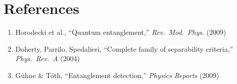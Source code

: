 \documentclass[11pt,a4paper]{article}
\begin{document}
\section*{References}

\begin{enumerate}
    \item Horodecki et al., ``Quantum entanglement,'' \textit{Rev.\ Mod.\ Phys.} (2009)
    \item Doherty, Parrilo, Spedalieri, ``Complete family of separability criteria,'' \textit{Phys.\ Rev.\ A} (2004)
    \item G\"uhne \& T\'oth, ``Entanglement detection,'' \textit{Physics Reports} (2009)
\end{enumerate}
\end{document}
